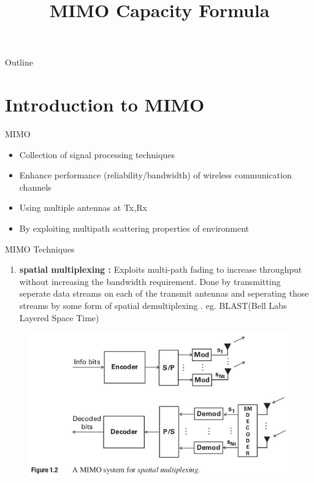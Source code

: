 \documentclass[11pt]{beamer}
\title{MIMO Capacity Formula}
\institute{BITS Pilani}
\begin{document}
\begin{frame}
\maketitle
\end{frame}
\begin{frame}{Outline}
  \tableofcontents
\end{frame}

\section{Introduction to MIMO}


\begin{frame}{MIMO}
  \begin{itemize}
  \item Collection of signal processing techniques 
  \item Enhance performance (reliability/bandwidth) of wireless communication channels
  \item Using multiple antennas at Tx,Rx
  \item By exploiting multipath scattering properties of environment 
  \end{itemize}
\end{frame}
\begin{frame}{MIMO Techniques}
  \begin{enumerate}
    \item \textbf{spatial multiplexing :} Exploits multi-path fading to increase throughput without increasing the bandwidth requirement.
    Done by transmitting seperate data streams on each of the transmit antennas and seperating those streams by some form of spatial demultiplexing . eg. BLAST(Bell Labs Layered Space Time)
  \end{enumerate}
  \begin{figure}[H]
  \centering
  \includegraphics[scale=0.4]{spatial_multiplexing}
  \end{figure}
\end{frame}
\end{document}

